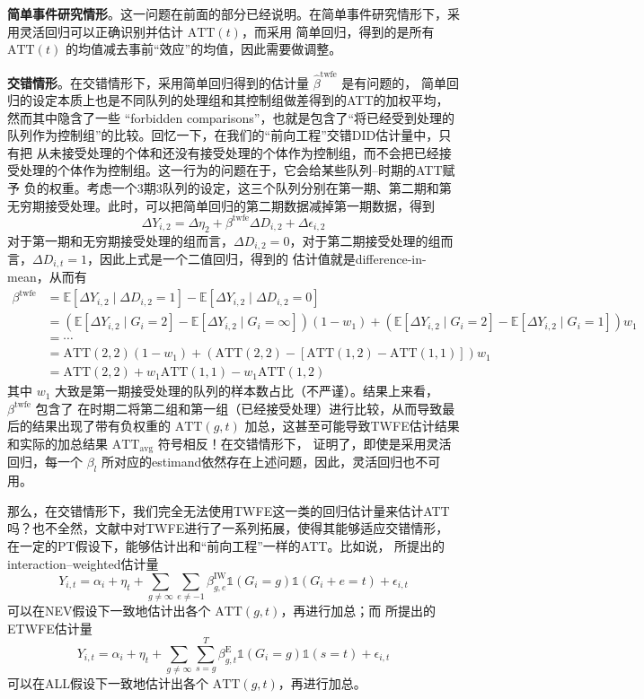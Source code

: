 \documentclass[../didNotes.tex]{subfiles}
\begin{document}
\textbf{简单事件研究情形}。这一问题在前面的部分已经说明。在简单事件研究情形下，采用灵活回归可以正确识别并估计 $\text{ATT}(t)$，而采用
简单回归，得到的是所有 $\text{ATT}(t)$ 的均值减去事前``效应''的均值，因此需要做调整。

\textbf{交错情形}。在交错情形下，采用简单回归得到的估计量 $\hat{\beta}^{\text{twfe}}$ 是有问题的，
简单回归的设定本质上也是不同队列的处理组和其控制组做差得到的ATT的加权平均，然而其中隐含了一些
``forbidden comparisons''，也就是包含了``将已经受到处理的队列作为控制组''的比较。回忆一下，在我们的``前向工程''交错DID估计量中，只有把
从未接受处理的个体和还没有接受处理的个体作为控制组，而不会把已经接受处理的个体作为控制组。这一行为的问题在于，它会给某些队列--时期的ATT赋予
负的权重。考虑一个3期3队列的设定，这三个队列分别在第一期、第二期和第无穷期接受处理。此时，可以把简单回归的第二期数据减掉第一期数据，得到
$$
\Delta Y_{i,2} = \Delta \eta_{2} + \beta^{\text{twfe}} \Delta D_{i,2} + \Delta \epsilon_{i,2}
$$
对于第一期和无穷期接受处理的组而言，$\Delta D_{i,2}=0$，对于第二期接受处理的组而言，$\Delta D_{i,t}=1$，因此上式是一个二值回归，得到的
估计值就是difference-in-mean，从而有
\begin{align*}
  \beta^{\text{twfe}} &= \mathbb{E}[\Delta Y_{i,2} \mid \Delta D_{i,2}=1] - \mathbb{E}[\Delta Y_{i,2} \mid
  \Delta D_{i,2}=0] \\
  &= \left(\mathbb{E}[\Delta Y_{i,2} \mid G_{i}=2] - \mathbb{E}[\Delta Y_{i,2} \mid G_{i}=\infty]\right)(1-w_{1}) +
  \left(\mathbb{E}[\Delta Y_{i,2} \mid G_{i}=2] - \mathbb{E}[\Delta Y_{i,2} \mid G_{i}=1]\right)w_{1} \\
  &= \cdots \\
  &= \text{ATT}(2,2)(1-w_{1}) + \left( \text{ATT}(2,2)-[\text{ATT}(1,2)-\text{ATT}(1,1)] \right) w_{1} \\
  &= \text{ATT}(2,2)+w_{1} \text{ATT}(1,1) - w_{1} \text{ATT}(1,2)
\end{align*}
其中 $w_{1}$ 大致是第一期接受处理的队列的样本数占比（不严谨）。结果上来看，$\beta^{\text{twfe}}$ 包含了
在时期二将第二组和第一组（已经接受处理）进行比较，从而导致最后的结果出现了带有负权重的 $\text{ATT}(g,t)$ 加总，这甚至可能导致TWFE估计结果
和实际的加总结果 $\text{ATT}_{\text{avg}}$ 符号相反！在交错情形下，\textcite{sun2021} 证明了，即使是采用灵活回归，每一个 $\beta_{l}$
所对应的estimand依然存在上述问题，因此，灵活回归也不可用。

那么，在交错情形下，我们完全无法使用TWFE这一类的回归估计量来估计ATT吗？也不全然，文献中对TWFE进行了一系列拓展，使得其能够适应交错情形，
在一定的PT假设下，能够估计出和``前向工程''一样的ATT。比如说，\textcite{sun2021} 所提出的interaction--weighted估计量
$$
Y_{i,t} = \alpha_{i} + \eta_{t} + \sum_{g \neq \infty} \sum_{e \neq -1} \beta_{g,e}^{\text{IW}} \mathbb{1} (G_{i}=g)
\mathbb{1}(G_{i}+e=t) + \epsilon_{i,t}
$$
可以在NEV假设下一致地估计出各个 $\text{ATT}(g,t)$，再进行加总；而 \textcite{wooldridge2021} 所提出的ETWFE估计量
$$
Y_{i,t} = \alpha_{i} + \eta_{t} + \sum_{g \neq \infty} \sum_{s = g}^{T} \beta_{g,t}^{\text{E}} \mathbb{1} (G_{i}=g)
\mathbb{1}(s=t) + \epsilon_{i,t}
$$
可以在ALL假设下一致地估计出各个 $\text{ATT}(g,t)$，再进行加总。
\end{document}
